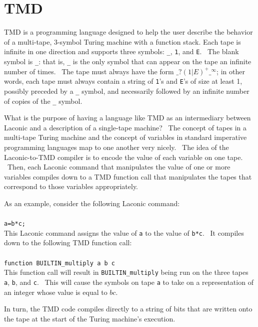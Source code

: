 \documentclass[11pt]{article}
\begin{document}
\section{TMD}

TMD is a programming language designed to help the user describe the behavior of a multi-tape, $3$-symbol Turing machine with a function stack. Each tape is infinite in one direction and supports three symbols: \texttt{\_}, \texttt{1}, and \texttt{E}. \ The blank symbol is \texttt{\_}: that is, \texttt{\_} is the only symbol that can appear on the tape an infinite number of times. \ The tape must always have the form $\texttt{\_}?(1|E)^+\texttt{\_}^{\infty}$; in other words, each tape must always contain a string of \texttt{1}'s and \texttt{E}'s of size at least 1, possibly preceded by a \texttt{\_} symbol, and necessarily followed by an infinite number of copies of the \texttt{\_} symbol.

What is the purpose of having a language like TMD as an intermediary between Laconic and a description of a single-tape machine? \ The concept of tapes in a multi-tape Turing machine and the concept of variables in standard imperative programming languages map to one another very nicely. \ The idea of the Laconic-to-TMD compiler is to encode the value of each variable on one tape. \ Then, each Laconic command that manipulates the value of one or more variables compiles down to a TMD function call that manipulates the tapes that correspond to those variables appropriately.

As an example, consider the following Laconic command: \\ \\
\texttt{a=b*c;} \\

This Laconic command assigns the value of \texttt{a} to the value of \texttt{b*c}. \ It compiles down to the following TMD function call: \\ \\
\texttt{function BUILTIN\_multiply a b c} \\

This function call will result in \texttt{BUILTIN\_multiply} being run on the three tapes \texttt{a}, \texttt{b}, and \texttt{c}. \ This will cause the symbols on tape \texttt{a} to take on a representation of an integer whose value is equal to $bc$.

In turn, the TMD code compiles directly to a string of bits that are written onto the tape at the start of the Turing machine's execution.
\end{document}
